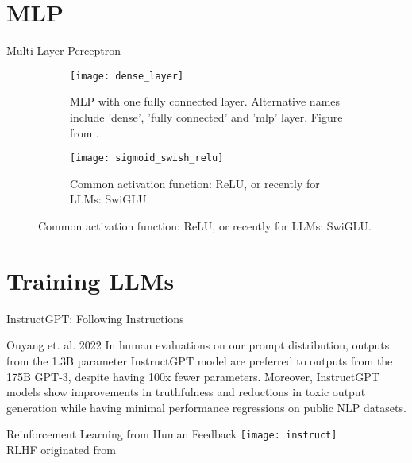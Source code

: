 \section{MLP}
\begin{frame}[c]{Multi-Layer Perceptron}
    \begin{figure}
        \begin{subfigure}{0.6\textwidth}
            \centering
            \texttt{[image: dense\_layer]}
            \caption{\gls{MLP} with one fully connected layer. Alternative names include 'dense', 'fully connected' and 'mlp' layer. Figure from \cite{convolutional_2018}.}
        \end{subfigure}
        \hspace{3em}
        \begin{subfigure}{0.3\textwidth}
            \texttt{[image: sigmoid\_swish\_relu]}
            \caption{Common activation function: \gls{ReLU}, or recently for \glspl{LLM}: \gls{SwiGLU}.}
        \end{subfigure}
    \end{figure}
\end{frame}

\section{Training LLMs}
\begin{frame}[c]{InstructGPT: Following Instructions}
    \large
    \begin{aquote}{Ouyang et. al. 2022 \cite{ouyang_training_2022}}
        In human evaluations on our prompt distribution, outputs from the 1.3B
        parameter InstructGPT model are preferred to outputs from the 175B
        GPT-3, despite having 100x fewer parameters. Moreover, InstructGPT
        models show improvements in truthfulness and reductions in toxic output
        generation while having minimal performance regressions on public NLP
        datasets.
    \end{aquote}
\end{frame}

\begin{frame}[c]{Reinforcement Learning from Human Feedback}
    \texttt{[image: instruct]}\\
     \large \hspace{2em} RLHF originated from \cite{christiano_deep_2017}
\end{frame}

